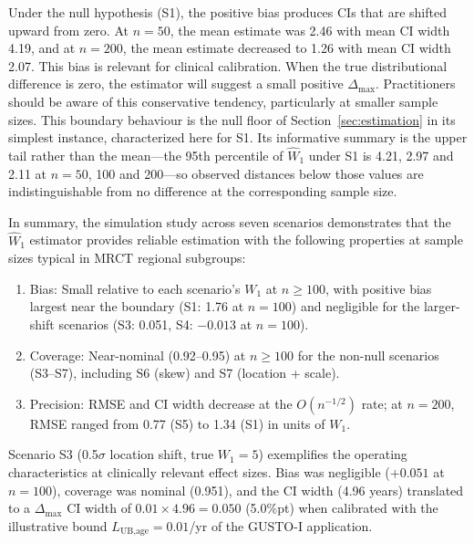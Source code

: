 \documentclass[AMA,Times1COL]{WileyNJDv5}
\begin{document}
Under the null hypothesis (S1), the positive bias produces CIs that are shifted upward from zero. At $n = 50$, the mean estimate was 2.46 with mean CI width 4.19, and at $n = 200$, the mean estimate decreased to 1.26 with mean CI width 2.07. This bias is relevant for clinical calibration. When the true distributional difference is zero, the estimator will suggest a small positive $\Delta_{\max}$. Practitioners should be aware of this conservative tendency, particularly at smaller sample sizes. This boundary behaviour is the null floor of Section~\ref{sec:estimation} in its simplest instance, characterized here for S1. Its informative summary is the upper tail rather than the mean---the 95th percentile of $\widehat{W}_1$ under S1 is 4.21, 2.97 and 2.11 at $n = 50$, 100 and 200---so observed distances below those values are indistinguishable from no difference at the corresponding sample size.

In summary, the simulation study across seven scenarios demonstrates that the $\widehat{W}_1$ estimator provides reliable estimation with the following properties at sample sizes typical in MRCT regional subgroups:
\begin{enumerate}[1.]
\item Bias: Small relative to each scenario's $W_1$ at $n \geq 100$, with positive bias largest near the boundary (S1: 1.76 at $n = 100$) and negligible for the larger-shift scenarios (S3: 0.051, S4: $-0.013$ at $n = 100$).
\item Coverage: Near-nominal (0.92--0.95) at $n \geq 100$ for the non-null scenarios (S3--S7), including S6 (skew) and S7 (location + scale).
\item Precision: RMSE and CI width decrease at the $O(n^{-1/2})$ rate; at $n = 200$, RMSE ranged from 0.77 (S5) to 1.34 (S1) in units of $W_1$.
\end{enumerate}

Scenario S3 (0.5$\sigma$ location shift, true $W_1 = 5$) exemplifies the operating characteristics at clinically relevant effect sizes. Bias was negligible ($+0.051$ at $n = 100$), coverage was nominal (0.951), and the CI width (4.96 years) translated to a $\Delta_{\max}$ CI width of $0.01 \times 4.96 = 0.050$ (5.0\%pt) when calibrated with the illustrative bound $L_{\text{UB,age}} = 0.01$/yr of the GUSTO-I application.
\end{document}
